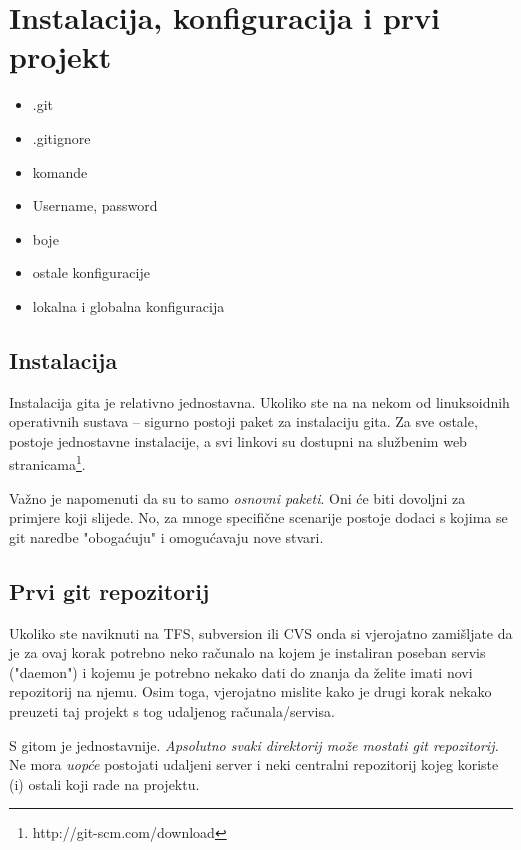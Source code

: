 \chapter*{Instalacija, konfiguracija i prvi projekt}

\begin{itemize}
   \item .git
   \item .gitignore
   \item komande
   \item Username, password
   \item boje
   \item ostale konfiguracije
   \item lokalna i globalna konfiguracija
\end{itemize}

\section*{Instalacija}

Instalacija gita je relativno jednostavna. Ukoliko ste na na nekom od linuksoidnih operativnih sustava -- sigurno postoji paket za instalaciju gita. 
Za sve ostale, postoje jednostavne instalacije, a svi linkovi su dostupni na službenim web stranicama\footnote{http://git-scm.com/download}.

Važno je napomenuti da su to samo \emph{osnovni paketi}. 
Oni će biti dovoljni za primjere koji slijede. 
No, za mnoge specifične scenarije postoje dodaci s kojima se git naredbe "obogaćuju" i omogućavaju nove stvari.

\section*{Prvi git repozitorij}

Ukoliko ste naviknuti na TFS, subversion ili CVS onda si vjerojatno zamišljate da je za ovaj korak potrebno neko računalo na kojem je instaliran poseban servis ("daemon") i kojemu je potrebno nekako dati do znanja da želite imati novi repozitorij na njemu.
Osim toga, vjerojatno mislite kako je drugi korak nekako preuzeti taj projekt s tog udaljenog računala/servisa.

S gitom je jednostavnije. 
\emph{Apsolutno svaki direktorij može mostati git repozitorij.}
Ne mora \emph{uopće} postojati udaljeni server i neki centralni repozitorij kojeg koriste (i) ostali koji rade na projektu.

